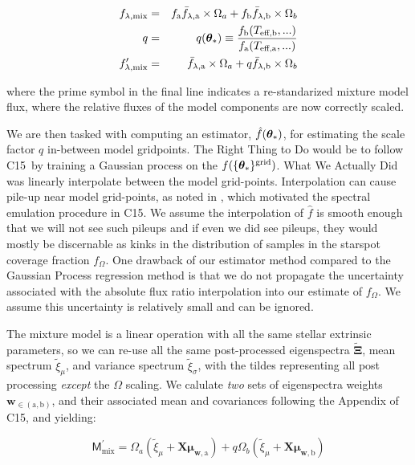 \documentclass[twocolumn]{emulateapj}%
\newcommand{\iancze}{{\sc C15}}
\begin{document}
\begin{eqnarray} \label{eqn:norm_scaling}
f_{\lambda, \mathrm{mix}} &=& f_{\mathrm{a}} \bar f_{\lambda, \mathrm{a}} \times \Omega_a + f_{\mathrm{b}} \bar f_{\lambda, \mathrm{b}} \times \Omega_b \\
q &=& q({\bm \theta}_{\ast})\equiv \frac{f_{\mathrm{b}}(T_\textrm{eff,b}, ...)}{f_{\mathrm{a}}(T_\textrm{eff,a}, ...)} \\
f_{\lambda, \mathrm{mix}}^{\prime} &=& \bar f_{\lambda, \mathrm{a}} \times \Omega_a + q \bar f_{\lambda, \mathrm{b}} \times \Omega_b
\end{eqnarray}

where the prime symbol in the final line indicates a re-standarized mixture model flux, where the relative fluxes of the model components are now correctly scaled.

We are then tasked with computing an estimator, $\hat f({\bm \theta}_{\ast})$, for estimating the scale factor $q$ in-between model gridpoints.  The Right Thing to Do would be to follow \iancze\ by training a Gaussian process on the $f(\{{\bm \theta}_{\ast}\}^\textrm{grid})$.  What We Actually Did was linearly interpolate between the model grid-points.  Interpolation can cause pile-up near model grid-points, as noted in \citet{cottaar14}, which motivated the spectral emulation procedure in \iancze.  We assume the interpolation of $\hat f$ is smooth enough that we will not see such pileups and if even we did see pileups, they would mostly be discernable as kinks in the distribution of samples in the starspot coverage fraction $f_{\Omega}$.  One drawback of our estimator method compared to the Gaussian Process regression method is that we do not propagate the uncertainty associated with the absolute flux ratio interpolation into our estimate of $f_{\Omega}$.  We assume this uncertainty is relatively small and can be ignored.

The mixture model is a linear operation with all the same stellar extrinsic parameters, so we can re-use all the same post-processed eigenspectra $\widetilde{\mathbf{\Xi}}$, mean spectrum $\widetilde{\xi}_\mu$, and variance spectrum $\widetilde{\xi}_\sigma$, with the tildes representing all post processing \emph{except} the $\Omega$ scaling.  We calulate \emph{two} sets of eigenspectra weights $\mathbf{w}_{\in (\mathrm{a}, \mathrm{b})}$, and their associated mean and covariances following the Appendix of \iancze, and yielding:

\begin{equation}
  \mathsf{M}_{\mathrm{mix}}^\prime = \Omega_a (\widetilde{\xi}_\mu + \mathbf{X} \mathbf{\mu}_{\mathbf{w}, \mathrm{a}}) + q \Omega_b (\widetilde{\xi}_\mu + \mathbf{X} \mathbf{\mu}_{\mathbf{w}, \mathrm{b}})
\end{equation}
\end{document}
